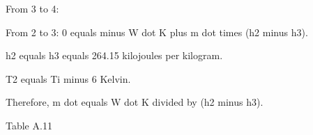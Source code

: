 From 3 to 4:  

From 2 to 3:  
0 equals minus W dot K plus m dot times (h2 minus h3).  

h2 equals  
h3 equals 264.15 kilojoules per kilogram.  

T2 equals Ti minus 6 Kelvin.  

Therefore, m dot equals W dot K divided by (h2 minus h3).  

Table A.11